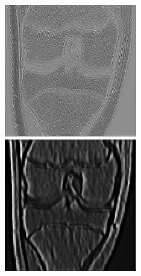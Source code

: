 \begin{figure}[H]
  \includegraphics[width=\linewidth]{imgs/channel1.png}
\endminipage\hfill
{}
  \includegraphics[width=\linewidth]{imgs/channel3.png}

\end{figure}
